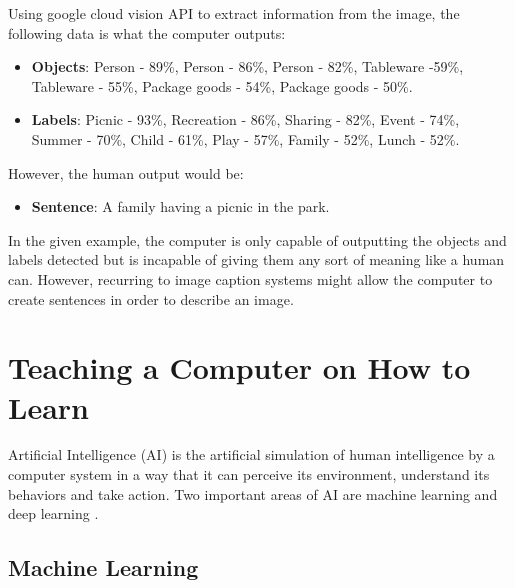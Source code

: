     Using google cloud vision API \cite{google} to extract information from the image, the following data is what the computer outputs:

    \begin{itemize}
        \item \textbf{Objects}: Person - 89\%, Person - 86\%, Person - 82\%, Tableware -59\%, Tableware - 55\%, Package goods - 54\%, Package goods - 50\%. 
        \item \textbf{Labels}: Picnic - 93\%, Recreation - 86\%, Sharing - 82\%, Event - 74\%, Summer - 70\%, Child - 61\%, Play - 57\%, Family - 52\%, Lunch - 52\%.
    \end{itemize}
   
   However, the human output would be: 
   
   \begin{itemize}
       \item \textbf{Sentence}: A family having a picnic in the park.
   \end{itemize}

    
   
    In the given example, the computer is only capable of outputting the objects and labels detected but is incapable of giving them any sort of meaning like a human can. However, recurring to image caption systems might allow the computer to create sentences in order to describe an image.





    \section{Teaching a Computer on How to Learn}
    \label{sec:teach}

    Artificial Intelligence (AI) is the artificial simulation of human intelligence by a computer system in a way that it can perceive its environment, understand its behaviors and take action. Two important areas of AI are machine learning and deep learning \cite{mathworks_AI}.

    

   \subsection{Machine Learning}

